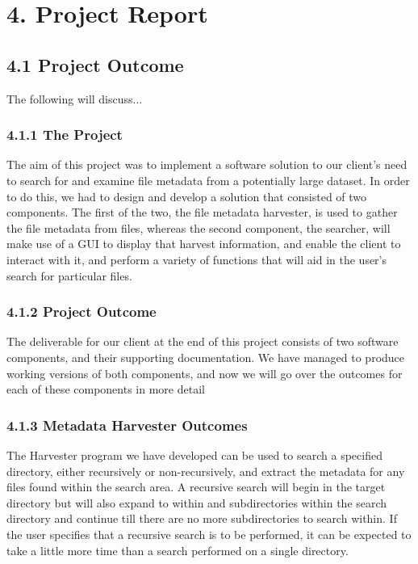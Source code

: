 \documentclass[11pt]{article}
\begin{document}

\section{4. Project Report}
\subsection{4.1 Project Outcome}
The following will discuss...

\begin{adjustwidth}{1cm}{}

\subsubsection{4.1.1 The Project}
The aim of this project was to implement a software solution to our client’s need to search for and examine file metadata from a potentially large dataset. In order to do this, we had to design and develop a solution that consisted of two components. The first of the two, the file metadata harvester, is used to gather the file metadata from files, whereas the second component, the searcher, will make use of a GUI to display that harvest information, and enable the client to interact with it, and perform a variety of functions that will aid in the user’s search for particular files.

\subsubsection{4.1.2 Project Outcome} 
The deliverable for our client at the end of this project consists of two software components, and their supporting documentation. We have managed to produce working versions of both components, and now we will go over the outcomes for each of these components in more detail

\subsubsection{4.1.3 Metadata Harvester Outcomes}
The Harvester program we have developed can be used to search a specified directory, either recursively or non-recursively, and extract the metadata for any files found within the search area. A recursive search will begin in the target directory but will also expand to within and subdirectories within the search directory and continue till there are no more subdirectories to search within. If the user specifies that a recursive search is to be performed, it can be expected to take a little more time than a search performed on a single directory. \\


\end{adjustwidth}
\end{document}
